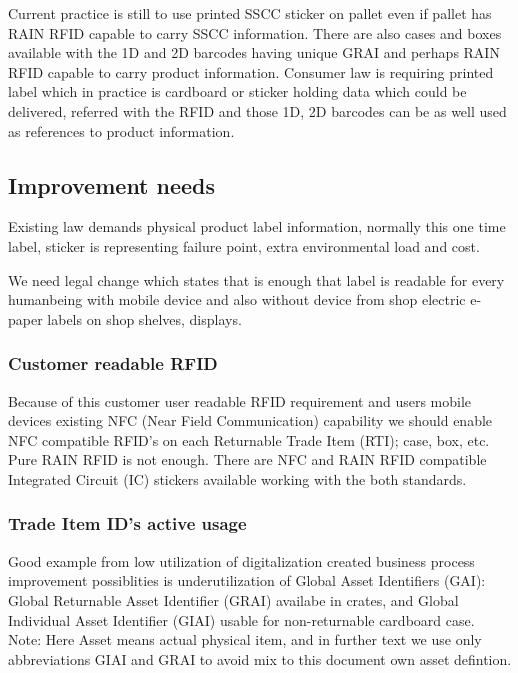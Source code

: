 Current practice is still to use printed SSCC sticker on pallet even if pallet
has RAIN RFID capable to carry SSCC information. There are also cases and boxes
available with the 1D and 2D barcodes having unique GRAI and perhaps RAIN RFID
capable to carry product information. Consumer law is requiring printed label
which in practice is cardboard or sticker holding data which could be
delivered, referred with the RFID and those 1D, 2D barcodes can be as well used
as references to product information.

\subsection{Improvement needs}
\label{improvement_needs}

Existing law demands physical product label information, normally this one time
label, sticker is representing failure point, extra environmental load and cost.

We need legal change which states that is enough that label is readable for
every humanbeing with mobile device and also without device from shop electric
e-paper labels on shop shelves, displays.

\subsubsection{Customer readable RFID}
\label{improvement_NFC_RFID}

Because of this customer user readable RFID requirement and users mobile devices
existing NFC (Near Field Communication) capability we should enable NFC compatible
RFID's on each Returnable Trade Item (RTI); case, box, etc. Pure RAIN RFID is not
enough. There are NFC and RAIN RFID compatible Integrated Circuit (IC)\cite{RAINFC}
stickers available\cite{RAINFC_label} working with the both standards.

\subsubsection{Trade Item ID's active usage}
\label{improvement_1D_2D_RFID_usage}

Good example from low utilization of digitalization created business process
improvement possiblities is underutilization of Global Asset Identifiers (GAI):
Global Returnable Asset Identifier (GRAI)
\cite{GRAI}\cite{IFCO}\cite{EUROPOOL}
availabe in crates, and Global Individual Asset Identifier (GIAI)
\cite{GIAI}\cite{CajoMakeBright} usable for non-returnable cardboard case.
Note: Here Asset means actual physical item, and in further text we use only
abbreviations GIAI and GRAI to avoid mix to this document own asset defintion.

